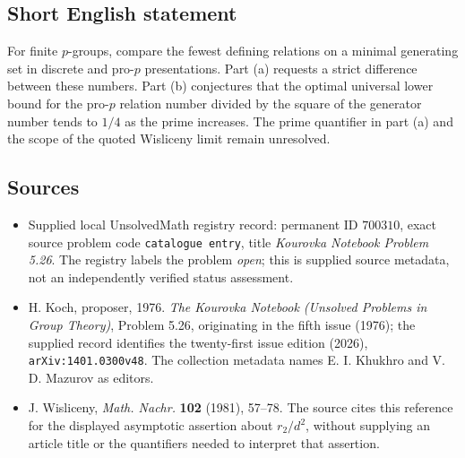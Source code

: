\documentclass[11pt]{article}
\begin{document}
\subsection{Short English statement}
For finite \(p\)-groups, compare the fewest defining relations on a minimal generating set in discrete and pro-\(p\) presentations. Part (a) requests a strict difference between these numbers. Part (b) conjectures that the optimal universal lower bound for the pro-\(p\) relation number divided by the square of the generator number tends to \(1/4\) as the prime increases. The prime quantifier in part (a) and the scope of the quoted Wisliceny limit remain unresolved.
\subsection{Sources}
\begin{itemize}
\item Supplied local UnsolvedMath registry record: permanent ID \(700310\), exact source problem code \texttt{catalogue entry}, title \emph{Kourovka Notebook Problem 5.26}. The registry labels the problem \emph{open}; this is supplied source metadata, not an independently verified status assessment.
\item H. Koch, proposer, 1976. \emph{The Kourovka Notebook (Unsolved Problems in Group Theory)}, Problem 5.26, originating in the fifth issue (1976); the supplied record identifies the twenty-first issue edition (2026), \texttt{arXiv:1401.0300v48}. The collection metadata names E. I. Khukhro and V. D. Mazurov as editors.
\item J. Wisliceny, \emph{Math. Nachr.} \textbf{102} (1981), 57--78. The source cites this reference for the displayed asymptotic assertion about \(r_2/d^2\), without supplying an article title or the quantifiers needed to interpret that assertion.
\end{itemize}
\end{document}
